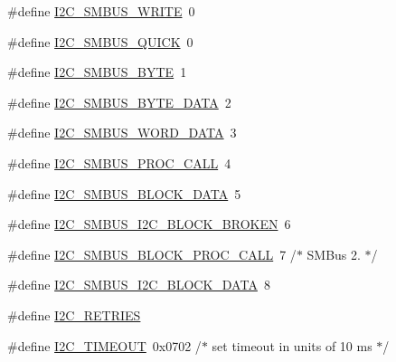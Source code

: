 \begin{DoxyCompactItemize}
\#define \hyperlink{smbus-cffi-0_83_82_2include_2linux_2i2c-dev_8h_ac4d2a9af170b85b33c640c811f240c76}{I2\+C\+\_\+\+S\+M\+B\+U\+S\+\_\+\+W\+R\+I\+T\+E}~0
\item 
\#define \hyperlink{smbus-cffi-0_83_82_2include_2linux_2i2c-dev_8h_a94760c9e3bb58f5535578eb52a0ffc0c}{I2\+C\+\_\+\+S\+M\+B\+U\+S\+\_\+\+Q\+U\+I\+C\+K}~0
\item 
\#define \hyperlink{smbus-cffi-0_83_82_2include_2linux_2i2c-dev_8h_a8006fa66a9d9224959fb8337a365a12a}{I2\+C\+\_\+\+S\+M\+B\+U\+S\+\_\+\+B\+Y\+T\+E}~1
\item 
\#define \hyperlink{smbus-cffi-0_83_82_2include_2linux_2i2c-dev_8h_a3d7320d4d3f8b109344ee08feab0e533}{I2\+C\+\_\+\+S\+M\+B\+U\+S\+\_\+\+B\+Y\+T\+E\+\_\+\+D\+A\+T\+A}~2
\item 
\#define \hyperlink{smbus-cffi-0_83_82_2include_2linux_2i2c-dev_8h_abd0ad56a944b1a95435d51cc54db36c4}{I2\+C\+\_\+\+S\+M\+B\+U\+S\+\_\+\+W\+O\+R\+D\+\_\+\+D\+A\+T\+A}~3
\item 
\#define \hyperlink{smbus-cffi-0_83_82_2include_2linux_2i2c-dev_8h_a140bc92b58f10de5eb796ad71e8f0da2}{I2\+C\+\_\+\+S\+M\+B\+U\+S\+\_\+\+P\+R\+O\+C\+\_\+\+C\+A\+L\+L}~4
\item 
\#define \hyperlink{smbus-cffi-0_83_82_2include_2linux_2i2c-dev_8h_a0253f81d1f2732492c1a05dc41094d12}{I2\+C\+\_\+\+S\+M\+B\+U\+S\+\_\+\+B\+L\+O\+C\+K\+\_\+\+D\+A\+T\+A}~5
\item 
\#define \hyperlink{smbus-cffi-0_83_82_2include_2linux_2i2c-dev_8h_a36bcbcb9294695fddb8606a32cbedc9b}{I2\+C\+\_\+\+S\+M\+B\+U\+S\+\_\+\+I2\+C\+\_\+\+B\+L\+O\+C\+K\+\_\+\+B\+R\+O\+K\+E\+N}~6
\item 
\#define \hyperlink{smbus-cffi-0_83_82_2include_2linux_2i2c-dev_8h_a187e1de23e9935885cdb94ee429a2eed}{I2\+C\+\_\+\+S\+M\+B\+U\+S\+\_\+\+B\+L\+O\+C\+K\+\_\+\+P\+R\+O\+C\+\_\+\+C\+A\+L\+L}~7		/$\ast$ S\+M\+Bus 2. $\ast$/
\item 
\#define \hyperlink{smbus-cffi-0_83_82_2include_2linux_2i2c-dev_8h_aa5ecbb0ceaddcb905d68d366edfb026c}{I2\+C\+\_\+\+S\+M\+B\+U\+S\+\_\+\+I2\+C\+\_\+\+B\+L\+O\+C\+K\+\_\+\+D\+A\+T\+A}~8
\item 
\#define \hyperlink{smbus-cffi-0_83_82_2include_2linux_2i2c-dev_8h_ae8b7ab32459314e0c0162974f2ce22e1}{I2\+C\+\_\+\+R\+E\+T\+R\+I\+E\+S}
\item 
\#define \hyperlink{smbus-cffi-0_83_82_2include_2linux_2i2c-dev_8h_afa3215f0aa766367f5d34bee80929152}{I2\+C\+\_\+\+T\+I\+M\+E\+O\+U\+T}~0x0702	/$\ast$ set timeout in units of 10 ms $\ast$/
\item 

\end{DoxyCompactItemize}
